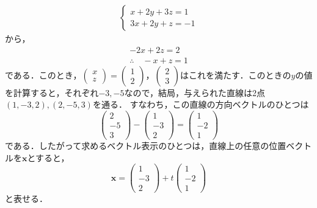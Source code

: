 \documentclass[a4paper,10pt,fleqn]{ltjsarticle}
\begin{document}
\begin{tleftbar}
    \begin{align*}
        \begin{cases}
            x+2y+3z=1 \\
            3x+2y+z=-1
        \end{cases}
    \end{align*}
    から，
    \begin{gather*}
        -2x+2z=2 \\
        \therefore \quad -x+z=1
    \end{gather*}
    である．このとき，$
        \begin{pmatrix}
            x \\
            z
        \end{pmatrix}
        =
        \begin{pmatrix}
            1 \\
            2
        \end{pmatrix}
        ，
        \begin{pmatrix}
            2 \\
            3
        \end{pmatrix}
    $はこれを満たす．このときの$y$の値を計算すると，それぞれ$-3,-5$なので，結局，与えられた直線は2点$(1,-3,2),(2,-5,3)$を通る．
    すなわち，この直線の方向ベクトルのひとつは
    \[
        \begin{pmatrix}
            2  \\
            -5 \\
            3
        \end{pmatrix}
        -
        \begin{pmatrix}
            1  \\
            -3 \\
            2
        \end{pmatrix}
        =
        \begin{pmatrix}
            1  \\
            -2 \\
            1
        \end{pmatrix}
    \]
    である．したがって求めるベクトル表示のひとつは，直線上の任意の位置ベクトルを$\bm{x}$とすると，
    \[
        \bm{x} =
        \begin{pmatrix}
            1  \\
            -3 \\
            2
        \end{pmatrix}
        +t
        \begin{pmatrix}
            1  \\
            -2 \\
            1
        \end{pmatrix}
    \]
    と表せる．
\end{tleftbar}
\end{document}
